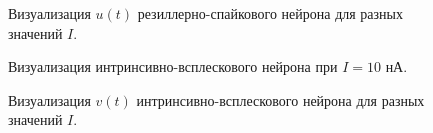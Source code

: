 \begin{figure}[h]
	\caption{Визуализация $u(t)$ резиллерно-спайкового нейрона для разных значений $I$.}
	\label{rz_different_I_recovery}
\end{figure}

\begin{figure}[h]
\caption{Визуализация интринсивно-всплескового нейрона при $I=10$ нА.}
\label{1_ib}
\end{figure}

\begin{figure}[h]
	\caption{Визуализация $v(t)$ интринсивно-всплескового нейрона для разных значений $I$.}
	\label{ib_different_I_potentials}
\end{figure}

